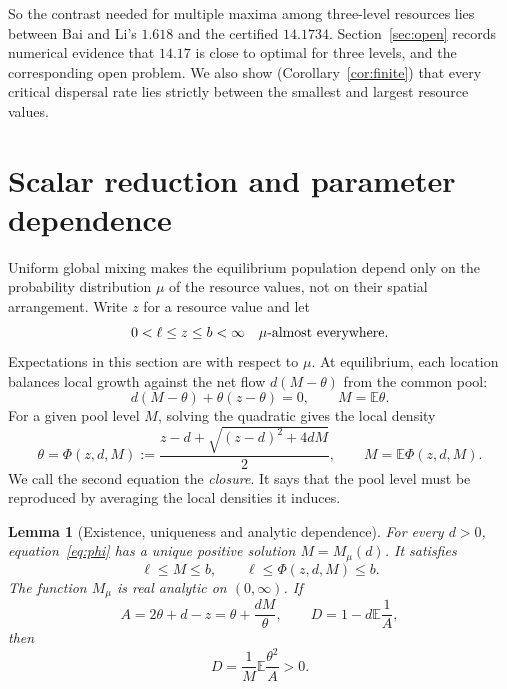 \documentclass[11pt]{article}
\newtheorem{lemma}[theorem]{Lemma}
\theoremstyle{remark}
\newcommand{\E}{\mathbb E}
\begin{document}
So the contrast needed for multiple maxima among three-level resources
lies between Bai and Li's \(1.618\) and the certified \(14.1734\).
Section~\ref{sec:open} records numerical evidence that \(14.17\) is close
to optimal for three levels, and the corresponding open problem. We also
show (Corollary~\ref{cor:finite}) that every critical dispersal rate lies
strictly between the smallest and largest resource values.

\section{Scalar reduction and parameter dependence}\label{sec:scalar}

Uniform global mixing makes the equilibrium population depend only on
the probability distribution \(\mu\) of the resource values, not on
their spatial arrangement. Write \(z\) for a resource value and let
\[
 0<\ell\leq z\leq b<\infty
 \quad\hbox{\(\mu\)-almost everywhere}.
\]
Expectations in this section are with respect to \(\mu\). At equilibrium,
each location balances local growth against the net flow
\(d(M-\theta)\) from the common pool:
\begin{equation}\label{eq:equilibrium}
 d(M-\theta)+\theta(z-\theta)=0,\qquad M=\E\theta .
\end{equation}
For a given pool level \(M\), solving the quadratic gives the local density
\begin{equation}\label{eq:phi}
 \theta=\Phi(z,d,M)
  :=\frac{z-d+\sqrt{(z-d)^2+4dM}}2,
 \qquad
 M=\E\Phi(z,d,M).
\end{equation}
We call the second equation the \emph{closure}. It says that the pool
level must be reproduced by averaging the local densities it induces.

\begin{lemma}[Existence, uniqueness and analytic dependence]\label{lem:scalar}
For every \(d>0\), equation~\eqref{eq:phi} has a unique positive solution
\(M=M_\mu(d)\). It satisfies
\[
 \ell\leq M\leq b,\qquad
 \ell\leq \Phi(z,d,M)\leq b.
\]
The function \(M_\mu\) is real analytic on \((0,\infty)\).
If
\begin{equation}\label{eq:A-D}
 A=2\theta+d-z=\theta+\frac{dM}{\theta},
 \qquad D=1-d\E\frac1A,
\end{equation}
then
\begin{equation}\label{eq:D-positive}
 D=\frac1M\E\frac{\theta^2}{A}>0.
\end{equation}
\end{lemma}
\end{document}

